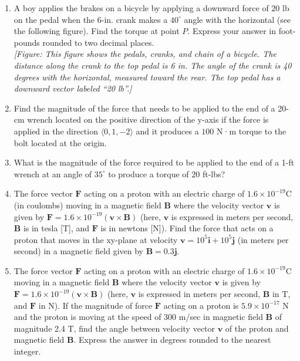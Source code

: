 \documentclass{exercises}
\begin{document}
\begin{enumerate}[resume]
\item \techrequired A boy applies the brakes on a bicycle by applying a downward force of $20$ lb on the pedal when the 6-in. crank makes a $40^\circ$ angle with the horizontal (see the following figure). Find the torque at point $P$. Express your answer in foot-pounds rounded to two decimal places. \\ \textit{[Figure: This figure shows the pedals, cranks, and chain of a bicycle. The distance along the crank to the top pedal is 6 in. The angle of the crank is 40 degrees with the horizontal, measured toward the rear. The top pedal has a downward vector labeled ``20 lb''.]}
\item \techrequired Find the magnitude of the force that needs to be applied to the end of a 20-cm wrench located on the positive direction of the y-axis if the force is applied in the direction $\langle0,1,-2\rangle$ and it produces a $100$ N·m torque to the bolt located at the origin.
\item \techrequired What is the magnitude of the force required to be applied to the end of a 1-ft wrench at an angle of $35^\circ$ to produce a torque of $20$ ft-lbs?
\item \techrequired The force vector $\mathbf{F}$ acting on a proton with an electric charge of $1.6\times 10^{-19}\text{C}$ (in coulombs) moving in a magnetic field $\mathbf{B}$ where the velocity vector $\mathbf{v}$ is given by $\mathbf{F}=1.6\times 10^{-19}(\mathbf{v}\times \mathbf{B})$ (here, $\mathbf{v}$ is expressed in meters per second, $\mathbf{B}$ is in tesla [T], and $\mathbf{F}$ is in newtons [N]). Find the force that acts on a proton that moves in the xy-plane at velocity $\mathbf{v}=10^{5}\mathbf{i}+10^{5}\mathbf{j}$ (in meters per second) in a magnetic field given by $\mathbf{B}=0.3\mathbf{j}$.
\item \techrequired The force vector $\mathbf{F}$ acting on a proton with an electric charge of $1.6\times 10^{-19}\text{C}$ moving in a magnetic field $\mathbf{B}$ where the velocity vector $\mathbf{v}$ is given by $\mathbf{F}=1.6\times 10^{-19}(\mathbf{v}\times \mathbf{B})$ (here, $\mathbf{v}$ is expressed in meters per second, $\mathbf{B}$ in $\text{T}$, and $\mathbf{F}$ in $\text{N}$). If the magnitude of force $\mathbf{F}$ acting on a proton is $5.9\times 10^{-17}$ N and the proton is moving at the speed of 300 m/sec in magnetic field $\mathbf{B}$ of magnitude 2.4 T, find the angle between velocity vector $\mathbf{v}$ of the proton and magnetic field $\mathbf{B}$. Express the answer in degrees rounded to the nearest integer.

\end{enumerate}
\end{document}
